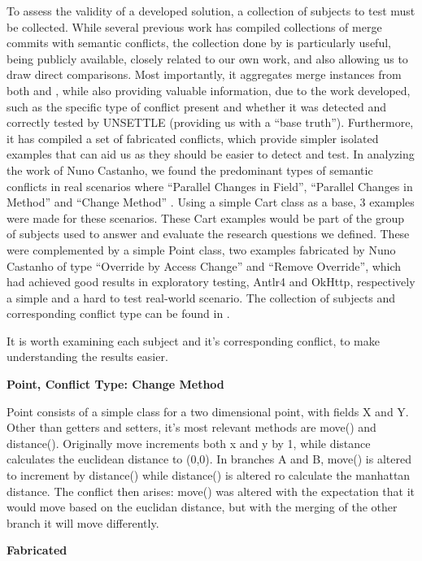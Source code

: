 To assess the validity of a developed solution, a collection of subjects to test must be collected. While several previous work has compiled collections of merge commits with semantic conflicts, the collection done by \citet{kn:nuno} is particularly useful, being publicly available, closely related to our own work, and also allowing us to draw direct comparisons. Most importantly, it aggregates merge instances from both \citet{kn:leuson} and \citet{kn:safemerge}, while also providing valuable information, due to the work developed, such as the specific type of conflict present and whether it was detected and correctly tested by UNSETTLE (providing us with a ``base truth''). Furthermore, it has compiled a set of fabricated conflicts, which provide simpler isolated examples that can aid us as they should be easier to detect and test.
In analyzing the work of Nuno Castanho, we found the predominant types of semantic conflicts in real scenarios where ``Parallel Changes in Field'', ``Parallel Changes in Method'' and ``Change Method'' \citet{kn:nuno}. Using a simple Cart class as a base, 3 examples were made for these scenarios.
These Cart examples would be part of the group of subjects used to answer and evaluate the research questions we defined. These were complemented by a simple Point class, two examples fabricated by Nuno Castanho of type ``Override by Access Change'' and ``Remove Override'', which had achieved good results in exploratory testing, Antlr4 and OkHttp, respectively a simple and a hard to test real-world scenario.
The collection of subjects and corresponding conflict type can be found in .

It is worth examining each subject and it's corresponding conflict, to make understanding the results easier.

\textbf{Point, Conflict Type: Change Method}

Point consists of a simple class for a two dimensional point, with fields X and Y.
Other than getters and setters, it's most relevant methods are move() and distance().
Originally move increments both x and y by 1, while distance calculates the euclidean distance to (0,0).
In branches A and B, move() is altered to increment by distance() while distance() is altered ro calculate
the manhattan distance. The conflict then arises: move() was altered with the expectation that it would move 
based on the euclidan distance, but with the merging of the other branch it will move differently.

\textbf{Fabricated}

